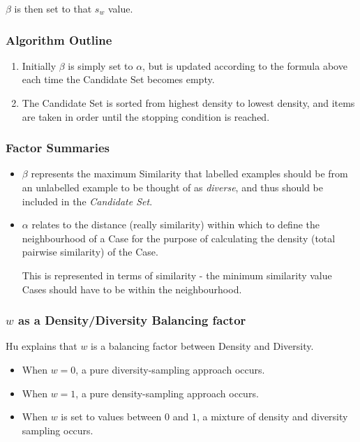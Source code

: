 \documentclass[a4paper,11pt]{report}
\begin{document}
$\beta$ is then set to that $s_{w}$ value.

\subsubsection{Algorithm Outline}
\begin{enumerate}
	\item Initially $\beta$ is simply set to $\alpha$, but is updated according to the formula above each time the Candidate Set becomes empty.
	\item The Candidate Set is sorted from highest density to lowest density, and items are taken in order until the stopping condition is reached.
\end{enumerate}

\subsubsection{Factor Summaries}
\begin{itemize}
	\item $\beta$ represents the maximum Similarity that labelled examples should be from an unlabelled example to be thought of as \emph{diverse}, and thus should be included in the \emph{Candidate Set}.

	\item $\alpha$ relates to the distance (really similarity) within which to define the neighbourhood of a Case for the purpose of calculating the density (total pairwise similarity) of the Case. 
	
	This is represented in terms of similarity - the minimum similarity value Cases should have to be within the neighbourhood.
	
\end{itemize}

\subsubsection{$w$ as a Density/Diversity Balancing factor}
Hu explains that $w$ is a balancing factor between Density and Diversity\citep{Hu2010}. 

\begin{itemize}
	\item When $w=0$, a pure diversity-sampling approach occurs. 
	\item When $w=1$, a pure density-sampling approach occurs. 
	\item When $w$ is set to values between $0$ and $1$, a mixture of density and diversity sampling occurs.
\end{itemize}
\end{document}
